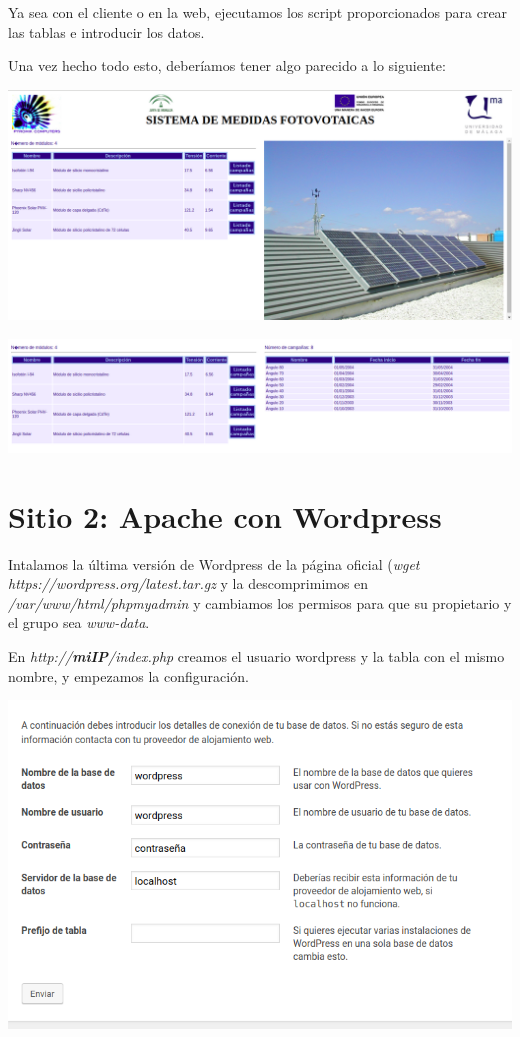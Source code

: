 \documentclass{article}
\begin{document}
Ya sea con el cliente o en la web, ejecutamos los script proporcionados para crear las tablas e introducir los datos.

Una vez hecho todo esto, deberíamos tener algo parecido a lo siguiente:

\begin{flushleft}
\includegraphics[scale=0.27]{fotovoltaico.png}
\end{flushleft}

\begin{flushleft}
\includegraphics[scale=0.27]{consulta.png}
\end{flushleft}

\section{Sitio 2: Apache con Wordpress}

Intalamos la última versión de Wordpress de la página oficial (\textit{wget https://wordpress.org/latest.tar.gz} y la descomprimimos en \textit{/var/www/html/phpmyadmin} y cambiamos los permisos para que su propietario y el grupo sea \textit{www-data}.

En \textit{http://\textbf{miIP}/index.php} creamos el usuario wordpress y la tabla con el mismo nombre, y empezamos la configuración.

\begin{flushleft}
\includegraphics[scale=0.5]{wp.png}
\end{flushleft}
\end{document}
